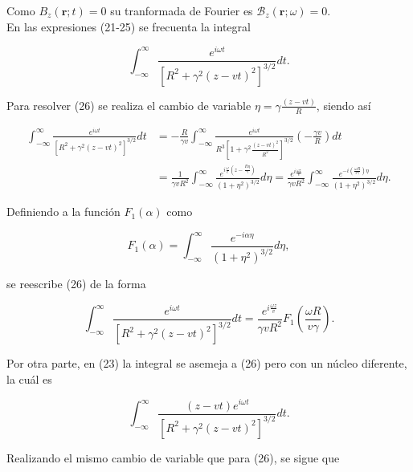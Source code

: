 \documentclass[a4paper,10pt]{article}
\begin{document}
Como $B_z(\textbf{r};t)=0$ su tranformada de Fourier es $\mathcal{B}_z(\textbf{r};\omega)=0$.\\
En las expresiones (21-25) se frecuenta la integral 

\begin{equation}
\int_{-\infty}^{\infty} \frac{e^{i\omega t}}{[R^2+\gamma^2(z-vt)^2]^{3/2}} dt.
\end{equation}

Para resolver (26) se realiza el cambio de variable $\eta=\gamma\frac{(z-vt)}{R}$, siendo así

\begin{equation*}
\begin{aligned}
\int_{-\infty}^{\infty} \frac{e^{i\omega t}}{[R^2+\gamma^2(z-vt)^2]^{3/2}} dt &= -\frac{R}{\gamma v} \int_{-\infty}^{\infty} \frac{e^{i\omega t}}{R^3 \left[ 1+ \gamma^2 \frac{(z-vt)^2}{R^2} \right]^{3/2}} \left( -\frac{\gamma v}{R} \right) dt \\
	&= \frac{1}{\gamma vR^2} \int_{-\infty}^{\infty} \frac{e^{i\frac{\omega}{c}\left( z-\frac{R\eta}{\gamma}\right)}}{(1+\eta^2)^{3/2}} d\eta
	=\frac{e^{i\frac{\omega z}{v}} }{\gamma vR^2}\int_{-\infty}^{\infty} \frac{e^{-i\left(\frac{\omega R}{v\gamma}\right)\eta}}{(1+\eta^2)^{3/2}} d\eta.
\end{aligned}
\end{equation*}

Definiendo a la función $F_1(\alpha)$ como

\begin{equation}
F_1(\alpha)=\int_{-\infty}^{\infty} \frac{e^{-i\alpha\eta}}{(1+\eta^2)^{3/2}} d\eta,
\end{equation}

se reescribe (26) de la forma 

\begin{equation}
\int_{-\infty}^{\infty} \frac{e^{i\omega t}}{[R^2+\gamma^2(z-vt)^2]^{3/2}} dt = \frac{e^{i\frac{\omega z}{v}} }{\gamma vR^2} F_1\left( \frac{\omega R}{v\gamma}\right).
\end{equation}

Por otra parte, en (23) la integral se asemeja a (26) pero con un núcleo diferente, la cuál es

\begin{equation}
\int_{-\infty}^{\infty} \frac{(z-vt)e^{i\omega t}}{[R^2+\gamma^2(z-vt)^2]^{3/2}} dt.
\end{equation}

Realizando el mismo cambio de variable que para (26), se sigue que
\end{document}
